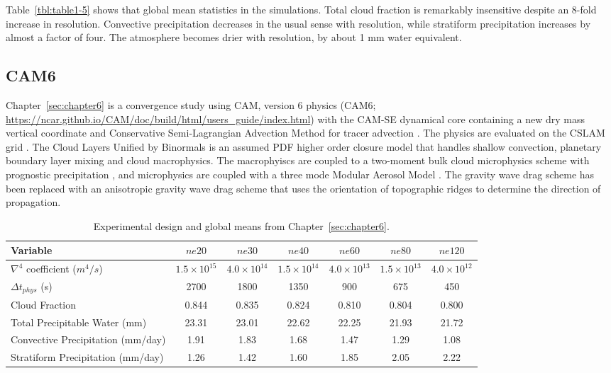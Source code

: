 Table~\ref{tbl:table1-5} shows that global mean statistics in the simulations. Total cloud fraction is remarkably insensitive despite an 8-fold increase in resolution. Convective precipitation decreases in the usual sense with resolution, while stratiform precipitation increases by almost a factor of four. The atmosphere becomes drier with resolution, by about 1 mm water equivalent.

\subsection{CAM6}

Chapter~\ref{sec:chapter6} is a convergence study using CAM, version 6 physics (CAM6; \url{https://ncar.github.io/CAM/doc/build/html/users_guide/index.html}) with the CAM-SE dynamical core containing a new dry mass vertical coordinate \citep{LetAl2018JAMES} and Conservative Semi-Lagrangian Advection Method for tracer advection \citep[CAM-SE-CSLAM; ][]{LTOUNGK2017MWR}. The physics are evaluated on the CSLAM grid \citep{HL2018MWR}. The Cloud Layers Unified by Binormals \citep[CLUBB][]{GETAL2002JAS,BOG2013JCLIM} is an assumed PDF higher order closure model that handles shallow convection, planetary boundary layer mixing and cloud macrophysics. The macrophyiscs are coupled to a two-moment bulk cloud microphysics scheme with prognostic precipitation \citep{MG2}, and microphysics are coupled with a three mode Modular Aerosol Model \citep{MAM}. The gravity wave drag scheme has been replaced with an anisotropic gravity wave drag scheme that uses the orientation of topographic ridges to determine the direction of propagation.

 \begin{table}
 \caption{Experimental design and global means from Chapter~\ref{sec:chapter6}.}
 \centering
 \scriptsize
 \begin{tabular}{lcccccc}
 \hline
 Variable & $ne20$ & $ne30$ & $ne40$ & $ne60$ & $ne80$ & $ne120$ \\
   \hline
   $\nabla^{4}$ coefficient ($m^4/s$) & $1.5 \times 10^{15}$ & $4.0 \times 10^{14}$ & $1.5 \times 10^{14}$ & $4.0 \times 10^{13}$  & $1.5 \times 10^{13}$ & $4.0 \times 10^{12}$\\
    $\Delta t_{phys}$ (s) & 2700 & 1800 & 1350 & 900 & 675 & 450 \\
   Cloud Fraction & 0.844 & 0.835 & 0.824 & 0.810 & 0.804 & 0.800 \\ 
   Total Precipitable Water (mm) & 23.31& 23.01 & 22.62 & 22.25 & 21.93 & 21.72 \\
   Convective Precipitation (mm/day) & 1.91 & 1.83 & 1.68 & 1.47 & 1.29 & 1.08 \\
   Stratiform Precipitation (mm/day) & 1.26 & 1.42 & 1.60 & 1.85 & 2.05 & 2.22 \\      
 \hline
 \end{tabular}
 \label{tbl:table1-6}
 \end{table}

